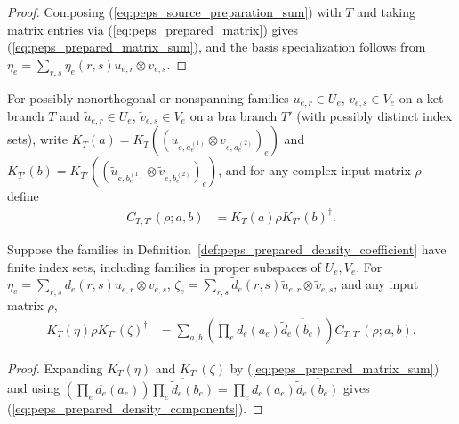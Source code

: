 \begin{proof}\leanok
    Composing (\ref{eq:peps_source_preparation_sum}) with $T$ and taking
    matrix entries via (\ref{eq:peps_prepared_matrix}) gives
    (\ref{eq:peps_prepared_matrix_sum}), and the basis specialization follows
    from $\eta_e=\sum_{r,s}\eta_e(r,s)u_{e,r}\otimes v_{e,s}$.
\end{proof}

\begin{definition}
    \label{def:peps_prepared_density_coefficient}
    \leanok
    For possibly nonorthogonal or nonspanning families $u_{e,r}\in U_e$,
    $v_{e,s}\in V_e$ on a ket branch $T$ and $\widetilde u_{e,r}\in U_e$,
    $\widetilde v_{e,s}\in V_e$ on a bra branch $T'$ (with possibly distinct
    index sets), write $K_T(a)=K_T((u_{e,a_e^{(1)}}\otimes v_{e,a_e^{(2)}})_e)$
    and $K_{T'}(b)=K_{T'}((\widetilde u_{e,b_e^{(1)}}\otimes\widetilde v_{e,b_e^{(2)}})_e)$,
    and for any complex input matrix $\rho$ define
    \begin{align}
        C_{T,T'}(\rho;a,b) & =K_T(a)\rho K_{T'}(b)^\dagger.
        \label{eq:peps_prepared_density_coefficient}
    \end{align}
\end{definition}

\begin{lemma}
    \label{thm:peps_prepared_density_components}
    \leanok
    Suppose the families in
    Definition~\ref{def:peps_prepared_density_coefficient} have finite
    index sets, including families in proper subspaces of $U_e,V_e$. For
    $\eta_e=\sum_{r,s}d_e(r,s)u_{e,r}\otimes v_{e,s}$,
    $\zeta_e=\sum_{r,s}\widetilde d_e(r,s)\widetilde u_{e,r}\otimes\widetilde v_{e,s}$,
    and any input matrix $\rho$,
    \begin{align}
        K_T(\eta)\rho K_{T'}(\zeta)^\dagger
         & =\sum_{a,b}\left(\prod_e
        d_e(a_e)\overline{\widetilde d_e(b_e)}\right)
        C_{T,T'}(\rho;a,b).
        \label{eq:peps_prepared_density_components}
    \end{align}
\end{lemma}

\begin{proof}\leanok
    Expanding $K_T(\eta)$ and $K_{T'}(\zeta)$ by
    (\ref{eq:peps_prepared_matrix_sum}) and using
    $(\prod_e d_e(a_e))\overline{\prod_e\widetilde d_e(b_e)}=\prod_e d_e(a_e)\overline{\widetilde d_e(b_e)}$
    gives (\ref{eq:peps_prepared_density_components}).
\end{proof}

